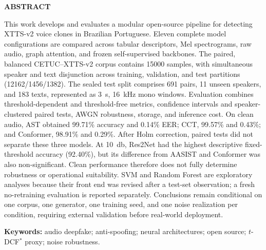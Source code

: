 \documentclass[12pt,a4paper]{article}
\begin{document}
\clearpage
\begin{center}\textbf{ABSTRACT}\end{center}
\vspace{0.5cm}
\begin{singlespace}
	\noindent
	This work develops and evaluates a modular open-source pipeline for detecting
	XTTS-v2 voice clones in Brazilian Portuguese. Eleven complete model
	configurations are compared across tabular descriptors, Mel spectrograms, raw
	audio, graph attention, and frozen self-supervised backbones. The paired,
	balanced CETUC--XTTS-v2 corpus contains \num{15000} samples, with simultaneous
	speaker and text disjunction across training, validation, and test partitions
	(\num{12162}/\num{1456}/\num{1382}). The sealed test split comprises
	\num{691} pairs, \num{11} unseen speakers, and \num{183} texts, represented as
	\SI{3}{\second}, \SI{16}{\kilo\hertz} mono windows. Evaluation combines
	threshold-dependent and threshold-free metrics, confidence intervals and
	speaker-clustered paired tests, AWGN robustness, storage, and inference cost.
	On clean audio, AST obtained \num{99,71}\% accuracy and \num{0,14}\% EER;
	CCT, \num{99,57}\% and \num{0,43}\%; and Conformer, \num{98,91}\% and
	\num{0,29}\%. After Holm correction, paired tests did not separate these three
	models. At \SI{10}{\decibel}, Res2Net had the highest descriptive
	fixed-threshold accuracy (\num{92,40}\%), but its difference from AASIST and
	Conformer was also non-significant. Clean performance therefore does not fully
	determine robustness or operational suitability. SVM and Random Forest are
	exploratory analyses because their front end was revised after a test-set
	observation; a fresh no-retraining evaluation is reported separately.
	Conclusions remain conditional on one corpus, one generator, one training seed,
	and one noise realization per condition, requiring external validation before
	real-world deployment.
	
	\vspace{0.4cm}
	\noindent\textbf{Keywords:} audio deepfake; anti-spoofing; neural architectures;
	open source; $t$-DCF$^\ast$ proxy; noise robustness.
\end{singlespace}
\end{document}
